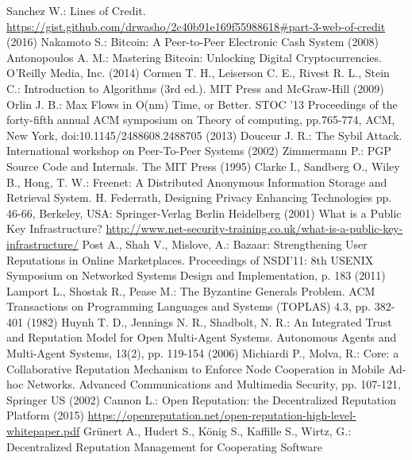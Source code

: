 \documentclass[11pt]{llncs}
\theoremstyle{definition}
\begin{document}
  \begin{thebibliography}{40}
     Sanchez W.: Lines of Credit. \url{https://gist.github.com/drwasho/2c40b91e169f55988618#part-3-web-of-credit} (2016)
     Nakamoto S.: Bitcoin: A Peer-to-Peer Electronic Cash System (2008)
     Antonopoulos A. M.: Mastering Bitcoin: Unlocking Digital Cryptocurrencies. O'Reilly Media, Inc. (2014)
     Cormen T. H., Leiserson C. E., Rivest R. L., Stein C.: Introduction to Algorithms (3rd ed.). MIT Press and McGraw-Hill
     (2009)
     Orlin J. B.: Max Flows in O(nm) Time, or Better. STOC '13 Proceedings of the forty-fifth annual ACM symposium on Theory
     of computing, pp.765-774, ACM, New York, doi:10.1145/2488608.2488705 (2013)
     Douceur J. R.: The Sybil Attack. International workshop on Peer-To-Peer Systems (2002)
     Zimmermann P.: PGP Source Code and Internals. The MIT Press (1995)
     Clarke I., Sandberg O., Wiley B., Hong, T. W.: Freenet: A Distributed Anonymous Information Storage and
     Retrieval System. H. Federrath, Designing Privacy Enhancing Technologies pp. 46-66, Berkeley, USA: Springer-Verlag
     Berlin Heidelberg (2001)
     What is a Public Key Infrastructure? \url{http://www.net-security-training.co.uk/what-is-a-public-key-infrastructure/}
     Post A., Shah V., Mislove, A.: Bazaar: Strengthening User Reputations in Online Marketplaces. Proceedings of NSDI'11:
     8th USENIX Symposium on Networked Systems Design and Implementation, p. 183 (2011)
     Lamport L., Shostak R., Pease M.: The Byzantine Generals Problem. ACM Transactions on Programming Languages and Systems
     (TOPLAS) 4.3, pp. 382-401 (1982)
     Huynh T. D., Jennings N. R., Shadbolt, N. R.: An Integrated Trust and Reputation Model for Open Multi-Agent Systems.
     Autonomous Agents and Multi-Agent Systems, 13(2), pp. 119-154 (2006)
     Michiardi P., Molva, R.: Core: a Collaborative Reputation Mechanism to Enforce Node Cooperation in Mobile Ad-hoc
     Networks. Advanced Communications and Multimedia Security, pp. 107-121, Springer US (2002)
     Cannon L.: Open Reputation: the Decentralized Reputation Platform (2015)
     \url{https://openreputation.net/open-reputation-high-level-whitepaper.pdf}
     Gr\"unert A., Hudert S., K\"onig S., Kaffille S., Wirtz, G.: Decentralized Reputation Management for Cooperating Software

\end{thebibliography}
\end{document}
